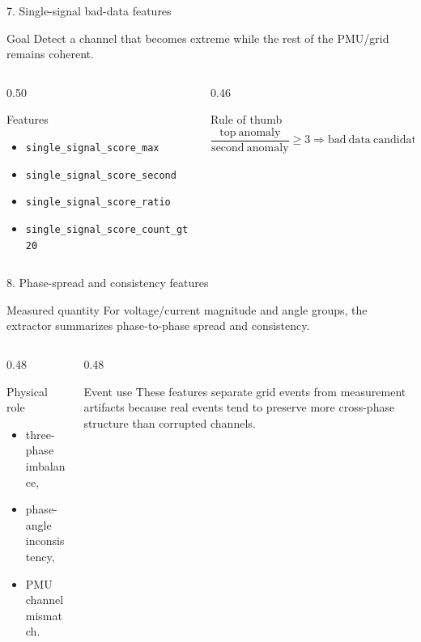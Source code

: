 ﻿\documentclass[10pt,aspectratio=169]{beamer}
\newcommand{\code}[1]{\texttt{\footnotesize #1}}
\begin{document}
\iffalse
\begin{frame}{7. Single-signal bad-data features}
\small
\begin{block}{Goal}
Detect a channel that becomes extreme while the rest of the PMU/grid remains coherent.
\end{block}
\begin{columns}[T,totalwidth=\textwidth]
\begin{column}{0.50\textwidth}
\begin{exampleblock}{Features}
\begin{itemize}
  \item \code{single\_signal\_score\_max}
  \item \code{single\_signal\_score\_second}
  \item \code{single\_signal\_score\_ratio}
  \item \code{single\_signal\_score\_count\_gt20}
\end{itemize}
\end{exampleblock}
\end{column}
\begin{column}{0.46\textwidth}
\begin{alertblock}{Rule of thumb}
\[
\frac{\mathrm{top\ anomaly}}{\mathrm{second\ anomaly}} \ge 3
\Rightarrow \mathrm{bad\ data\ candidate}
\]
\end{alertblock}
\end{column}
\end{columns}
\end{frame}

\begin{frame}{8. Phase-spread and consistency features}
\small
\begin{block}{Measured quantity}
For voltage/current magnitude and angle groups, the extractor summarizes phase-to-phase spread and consistency.
\end{block}
\begin{columns}[T,totalwidth=\textwidth]
\begin{column}{0.48\textwidth}
\begin{exampleblock}{Physical role}
\begin{itemize}
  \item three-phase imbalance,
  \item phase-angle inconsistency,
  \item PMU channel mismatch.
\end{itemize}
\end{exampleblock}
\end{column}
\begin{column}{0.48\textwidth}
\begin{alertblock}{Event use}
These features separate grid events from measurement artifacts because real events tend to preserve more cross-phase structure than corrupted channels.
\end{alertblock}
\end{column}
\end{columns}
\end{frame}
\end{document}
